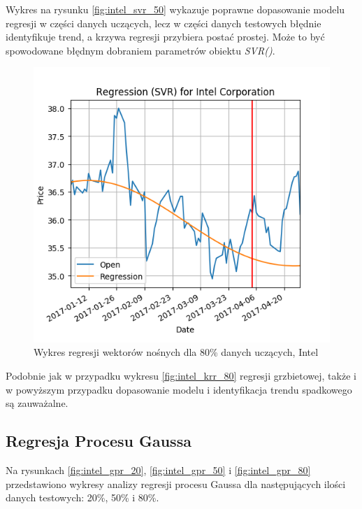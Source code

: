 Wykres na rysunku \ref{fig:intel_svr_50} wykazuje poprawne dopasowanie modelu regresji w części danych uczących, lecz w części danych testowych błędnie identyfikuje trend, a krzywa regresji przybiera postać prostej.
Może to być spowodowane błędnym dobraniem parametrów obiektu \textit{SVR()}.\\

\begin{figure}[ht]
\centering
\includegraphics[scale=0.4]{pictures/plots/intel_svr_80.png}
\caption{Wykres regresji wektorów nośnych dla 80\% danych uczących, Intel}
\label{fig:intel_svr_80}
\end{figure}

Podobnie jak w przypadku wykresu \ref{fig:intel_krr_80} regresji grzbietowej, także i w powyższym przypadku dopasowanie modelu i identyfikacja trendu spadkowego są zauważalne.\\

\subsection{Regresja Procesu Gaussa}

Na rysunkach \ref{fig:intel_gpr_20}, \ref{fig:intel_gpr_50} i \ref{fig:intel_gpr_80} przedstawiono wykresy analizy regresji procesu Gaussa dla następujących ilości danych testowych: 20\%, 50\% i 80\%.\\

